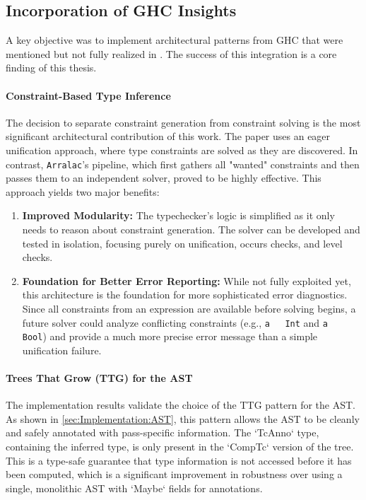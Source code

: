 \subsection{Incorporation of GHC Insights}
A key objective was to implement architectural patterns from GHC that were mentioned but not fully realized in \cite{jones-practical-2007}. The success of this integration is a core finding of this thesis.

\paragraph{Constraint-Based Type Inference}
The decision to separate constraint generation from constraint solving is the most significant architectural contribution of this work. The paper \cite{jones-practical-2007} uses an eager unification approach, where type constraints are solved as they are discovered. In contrast, \texttt{Arralac}'s pipeline, which first gathers all "wanted" constraints and then passes them to an independent solver, proved to be highly effective. This approach yields two major benefits:
\begin{enumerate}
    \item \textbf{Improved Modularity:} The typechecker's logic is simplified as it only needs to reason about constraint generation. The solver can be developed and tested in isolation, focusing purely on unification, occurs checks, and level checks.
    \item \textbf{Foundation for Better Error Reporting:} While not fully exploited yet, this architecture is the foundation for more sophisticated error diagnostics. Since all constraints from an expression are available before solving begins, a future solver could analyze conflicting constraints (e.g., \texttt{a ~ Int} and \texttt{a ~ Bool}) and provide a much more precise error message than a simple unification failure.
\end{enumerate}

\paragraph{Trees That Grow (TTG) for the AST}
The implementation results validate the choice of the TTG pattern for the AST. As shown in \cref{sec:Implementation:AST}, this pattern allows the AST to be cleanly and safely annotated with pass-specific information. The `TcAnno` type, containing the inferred type, is only present in the `CompTc` version of the tree. This is a type-safe guarantee that type information is not accessed before it has been computed, which is a significant improvement in robustness over using a single, monolithic AST with `Maybe` fields for annotations.

